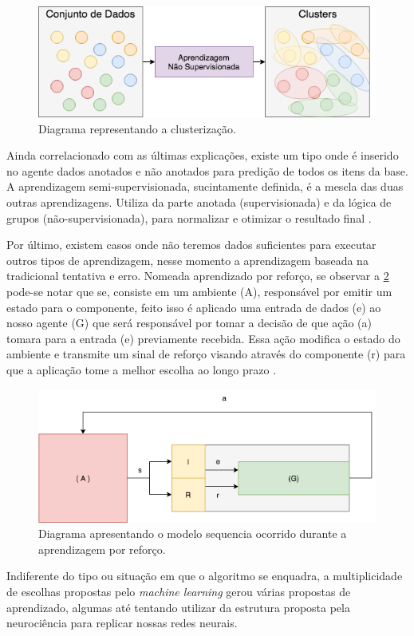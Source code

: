 \begin{figure}[H]
    \centering
    \includegraphics[width=.8\textwidth]{imagens/unsupervised.png}
    \caption{Diagrama representando a clusterização.}
    \label{fig:unsupervised}
\end{figure}

Ainda correlacionado com as últimas explicações, existe um tipo onde é inserido no agente dados anotados e não anotados para predição de todos os itens da base. A aprendizagem semi-supervisionada, sucintamente definida, é a mescla das duas outras aprendizagens. Utiliza da parte anotada (supervisionada) e da lógica de grupos (não-supervisionada), para normalizar e otimizar o resultado final \cite[7]{mohri2012foundations}.

Por último, existem casos onde não teremos dados suficientes para executar outros tipos de aprendizagem, nesse momento a aprendizagem baseada na tradicional tentativa e erro. Nomeada aprendizado por reforço, se observar a \ref{fig:reinforcement} pode-se notar que se, consiste em um ambiente (A), responsável por emitir um estado para o componente, feito isso é aplicado uma entrada de dados (e) ao nosso agente (G) que será responsável por tomar a decisão de que ação (a) tomara para a entrada (e) previamente recebida. Essa ação modifica o estado do ambiente e transmite um sinal de reforço visando através do componente (r) para que a aplicação tome a melhor escolha ao longo prazo \cite{kaelbling1996reinforcement, russell2003artificial}.

\begin{figure}[H]
    \centering
    \includegraphics[width=.8\textwidth]{imagens/reinforcement.png}
    \caption{Diagrama apresentando o modelo sequencia ocorrido durante a aprendizagem por reforço.}
    \label{fig:reinforcement}
\end{figure}

Indiferente do tipo ou situação em que o algoritmo se enquadra, a multiplicidade de escolhas propostas pelo \textit{machine learning} gerou várias propostas de aprendizado, algumas até tentando utilizar da estrutura proposta pela neurociência para replicar nossas redes neurais.
